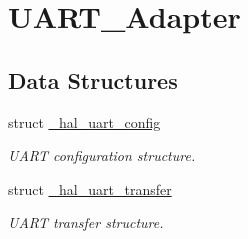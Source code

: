 \hypertarget{group___u_a_r_t___adapter}{}\section{U\+A\+R\+T\+\_\+\+Adapter}
\label{group___u_a_r_t___adapter}
\subsection*{Data Structures}
\begin{DoxyCompactItemize}
\item 
struct \mbox{\hyperlink{struct__hal__uart__config}{\+\_\+hal\+\_\+uart\+\_\+config}}
\begin{DoxyCompactList}\small\item\em U\+A\+RT configuration structure. \end{DoxyCompactList}\item 
struct \mbox{\hyperlink{struct__hal__uart__transfer}{\+\_\+hal\+\_\+uart\+\_\+transfer}}
\begin{DoxyCompactList}\small\item\em U\+A\+RT transfer structure. \end{DoxyCompactList}\end{DoxyCompactItemize}
